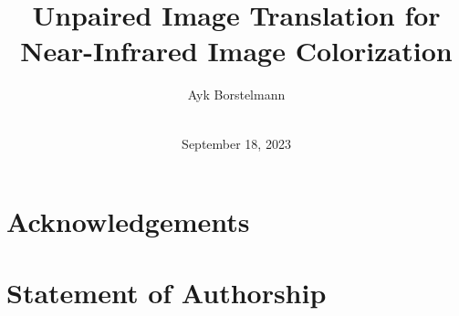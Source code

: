 \documentclass[ba,logo]{ivs-thesis}
\title{Unpaired Image Translation for Near-Infrared Image Colorization}
\author{Ayk Borstelmann\\\birthinfo{March 28, 2002 in Aschaffenburg}\\\matricnumber{3441004}}
\date{September 18, 2023}
\begin{document}
	
	\frontmatter 
	
	\maketitle 
	
	\cleardoublepage
	\begin{abstract}
		\blindtext[3]
	\end{abstract}

	\chapter*{Acknowledgements}  
	
	\cleardoublepage
	\chapter*{Statement of Authorship} 
	 
	
	\cleardoublepage
	\tableofcontents
	
	
	\mainmatter
	
	 
	
	
		
	 
	
	

	\begingroup 
	
	\backmatter
		
	\printbibliography[heading=bibintoc]
	
	\listoffigures
	
	\listoftables
	
	\endgroup 
	
	\appendix
	
\end{document}
